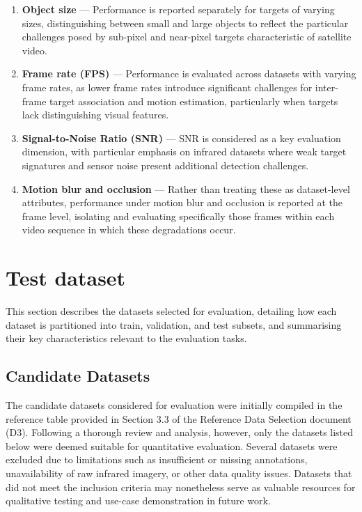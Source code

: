 \documentclass[11pt]{article}
\begin{document}
\begin{enumerate}
    \item \textbf{Object size} --- Performance is reported separately for targets of varying sizes, distinguishing between small and large objects to reflect the particular challenges posed by sub-pixel and near-pixel targets characteristic of satellite video.

    \item \textbf{Frame rate (FPS)} --- Performance is evaluated across datasets with varying frame rates, as lower frame rates introduce significant challenges for inter-frame target association and motion estimation, particularly when targets lack distinguishing visual features.

    \item \textbf{Signal-to-Noise Ratio (SNR)} --- SNR is considered as a key evaluation dimension, with particular emphasis on infrared datasets where weak target signatures and sensor noise present additional detection challenges.

    \item \textbf{Motion blur and occlusion} --- Rather than treating these as dataset-level attributes, performance under motion blur and occlusion is reported at the frame level, isolating and evaluating specifically those frames within each video sequence in which these degradations occur.
\end{enumerate}

\hypertarget{Test dataset}{%
\section{Test dataset}\label{Test dataset}}

\setlength{\LTpre}{4pt}
\setlength{\LTpost}{4pt}

This section describes the datasets selected for evaluation, detailing how each dataset is partitioned into train, validation, 
and test subsets, and summarising their key characteristics relevant to the evaluation tasks.

\subsection{Candidate Datasets}
The candidate datasets considered for evaluation were initially compiled in the reference table 
provided in Section 3.3 of the Reference Data Selection document (D3). Following a thorough 
review and analysis, however, only the datasets listed below were deemed suitable for quantitative 
evaluation. Several datasets were excluded due to limitations such as insufficient or missing 
annotations, unavailability of raw infrared imagery, or other data quality issues. Datasets that 
did not meet the inclusion criteria may nonetheless serve as valuable resources for qualitative 
testing and use-case demonstration in future work.
\end{document}
